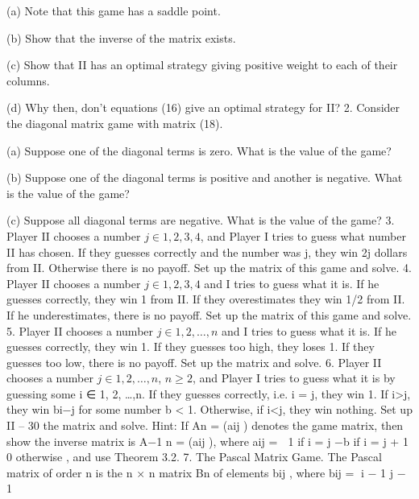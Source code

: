 \documentclass[]{report}
\begin{document}
\item[(a)] Note that this game has a saddle point.
\item[(b)] Show that the inverse of the matrix exists.
\item[(c)] Show that II has an optimal strategy giving positive weight to each of their columns.
\item[(d)] Why then, don’t equations (16) give an optimal strategy for II?
2. Consider the diagonal matrix game with matrix (18).
\item[(a)] Suppose one of the diagonal terms is zero. What is the value of the game?
\item[(b)] Suppose one of the diagonal terms is positive and another is negative. What is
the value of the game?
\item[(c)] Suppose all diagonal terms are negative. What is the value of the game?
3. Player II chooses a number $j \in {1, 2, 3, 4}$, and Player I tries to guess what number
II has chosen. If they guesses correctly and the number was j, they win  2j dollars from II.
Otherwise there is no payoff. Set up the matrix of this game and solve.
4. Player II chooses a number $j \in {1, 2, 3, 4}$ and I tries to guess what it is. If
he guesses correctly, they win  1 from II. If they overestimates they win  1/2 from II. If he
underestimates, there is no payoff. Set up the matrix of this game and solve.
5. Player II chooses a number $j \in {1, 2,\ldots,n}$ and I tries to guess what it is. If he
guesses correctly, they win  1. If they guesses too high, they loses 1. If they guesses too low, there
is no payoff. Set up the matrix and solve.
6. Player II chooses a number $j \in {1, 2,\ldots,n}$, $n \geq 2$, and Player I tries to guess
what it is by guessing some i ∈ {1, 2, \ldots,n}. If they guesses correctly, i.e. i = j, they win  1.
If i>j, they win  bi−j for some number b < 1. Otherwise, if i<j, they win  nothing. Set up
II – 30
the matrix and solve. Hint: If An = (aij ) denotes the game matrix, then show the inverse
matrix is A−1
n = (aij ), where aij =
 1 if i = j
−b if i = j + 1
0 otherwise
, and use Theorem 3.2.
7. The Pascal Matrix Game. The Pascal matrix of order n is the n × n matrix
Bn of elements bij , where
bij =
i − 1
j − 1
\end{document}
